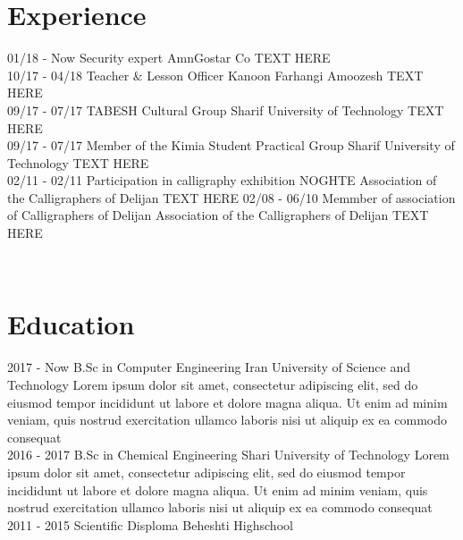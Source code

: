 \documentclass[a4paper]{friggeri-cv}
\begin{document}
\section{Experience}
\begin{entrylist}
  \entry
    {01/18 - Now}
    {Security expert}
    {AmnGostar Co}
    {TEXT HERE\\}
  \entry
    {10/17 - 04/18}
    {Teacher \& Lesson Officer }
    {Kanoon Farhangi Amoozesh}
    {TEXT HERE\\}
  \entry
    {09/17 - 07/17}
    {TABESH Cultural Group}
    {Sharif University of Technology}
        {TEXT HERE\\}
    \entry
    {09/17 - 07/17}
    {Member of the Kimia Student Practical Group}
    {Sharif University of Technology}
    {TEXT HERE\\}
    \entry
    {02/11 - 02/11}
    {Participation in calligraphy exhibition NOGHTE}
    {Association of the Calligraphers of Delijan}
    {TEXT HERE}
    \entry
        {02/08 - 06/10}
    {Memmber of association of Calligraphers of Delijan}
    {Association of the Calligraphers of Delijan}
    {TEXT HERE}
\end{entrylist}
\\
\section{Education}
\begin{entrylist}
  \entry
    {2017 - Now}
    {B.Sc in Computer Engineering}
    {Iran University of Science and Technology}
    {Lorem ipsum dolor sit amet, consectetur adipiscing elit, sed do eiusmod tempor incididunt ut labore et dolore magna aliqua. Ut enim ad minim veniam, quis nostrud exercitation ullamco laboris nisi ut aliquip ex ea commodo consequat\\}
  \entry
    {2016 - 2017}
    {B.Sc in Chemical Engineering}
    {Shari University of Technology}
    {Lorem ipsum dolor sit amet, consectetur adipiscing elit, sed do eiusmod tempor incididunt ut labore et dolore magna aliqua. Ut enim ad minim veniam, quis nostrud exercitation ullamco laboris nisi ut aliquip ex ea commodo consequat\\}
  \entry
    {2011 - 2015}
    {Scientific Disploma}
    {Beheshti Highschool}
    {}
\end{entrylist}

\newpage
\end{document}
